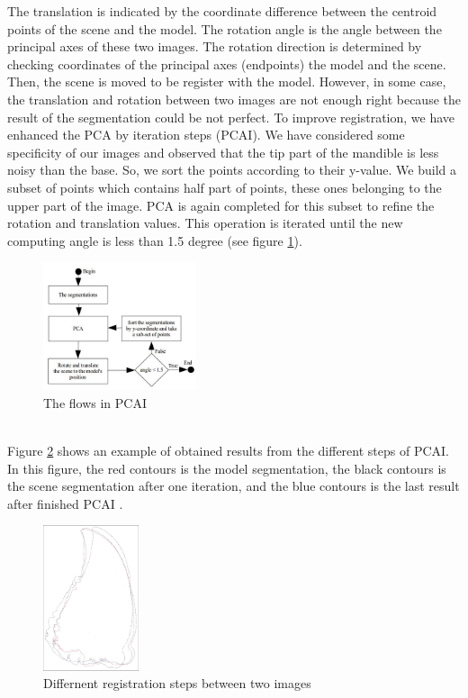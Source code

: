 \documentclass[twoside,twocolumn,10pt]{article}
\begin{document}
The translation is indicated by the coordinate difference between the centroid points of the scene and the model. The rotation angle is the angle between the principal axes of these two images. The rotation direction is determined by checking coordinates of the principal axes (endpoints) the model and the scene. Then, the scene is moved to be register with the model. However,
in some case, the translation and rotation between two images are
not enough right because the result of the segmentation could be not perfect. To improve registration, we have enhanced the PCA by iteration steps (PCAI). We have considered some specificity of our images and observed that the tip part of the mandible is less noisy than the base. So, we sort the points according to their y-value. We build a subset of points which contains half part of points, these ones belonging to the upper part of the image. PCA is again completed for this subset to refine the rotation and translation values. This operation is iterated until the new computing angle is less than 1.5 degree (see figure \ref{fig:pcai}).
\begin{figure}[htb]
    \centering
    \includegraphics[width=0.4\textwidth]{./images/pcadiagram}
    \caption{The flows in PCAI}
    \label{fig:pcai}
\end{figure}~\\
Figure \ref{fig:box} shows an example of obtained results from the different steps of PCAI. In this figure, the red contours is the model segmentation, the black contours is the scene segmentation after one iteration, and the blue contours is the last result after finished PCAI .\\

\begin{figure}[htb]
    \centering
    \includegraphics[width=0.25\textwidth]{./images/imreg}
    \caption{Differnent registration steps between two images}
    \label{fig:box}
\end{figure}
\end{document}
